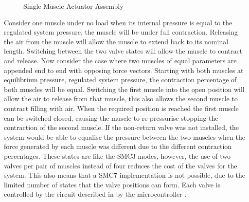 \documentclass[11pt,a4paper]{article}
\begin{document}
\begin{figure}[hbt!]
{
    }
        \caption{Single Muscle Actuator Assembly}
    \label{fig:pneumatic_valve}
\end{figure}

Consider one muscle under no load when its internal pressure is equal to the regulated system pressure, the muscle will be under full contraction. Releasing the air from the muscle will allow the muscle to extend back to its nominal length. Switching between the two valve states will allow the muscle to contract and release. Now consider the case where two muscles of equal parameters are appended end to end with opposing force vectors. Starting with both muscles at equilibrium pressure, regulated system pressure, the contraction percentage of both muscles will be equal. Switching the first muscle into the open position will allow the air to release from that muscle, this also allows the second muscle to contract filling with air. When the required position is reached the first muscle can be switched closed, causing the muscle to re-pressurise stopping the contraction of the second muscle. If the non-return valve was not installed, the system would be able to equalise the pressure between the two muscles when the force generated by each muscle was different due to the different contraction percentages. These states  are like the SMC3 modes, however, the use of two valves per pair of muscles instead of four reduces the cost of the valves for the system. This also means that a SMC7 implementation is not possible, due to the limited number of states that the valve positions can form.
Each valve is controlled by the circuit described in  by the microcontroller .
\end{document}
